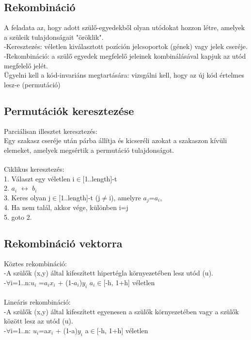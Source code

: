 \documentclass{article}
\begin{document}
	 \subsection{Rekombináció}
	 A feladata az, hogy adott szülő-egyedekből olyan utódokat hozzon létre, amelyek a szüleik tulajdonságait "öröklik".\\
	 -Keresztezés: véletlen kiválasztott pozíción jelcsoportok (gének) vagy jelek cseréje.\\
	 -Rekombináció: a szülő egyedek megfelelő jeleinek kombinálásával kapjuk az utód megfelelő jelét.\\
	 Ügyelni kell a kód-invariáns megtartására: vizsgálni kell, hogy az új kód értelmes lesz-e (permutáció)
	 
	 \subsection{Permutációk keresztezése}
	 Parciálisan illesztet keresztezés:\\
	 Egy szakasz cseréje után párba állítja és kicseréli azokat a szakaszon kívüli elemeket, amelyek megsértik a permutáció tulajdonságot.\\ \\
	 Ciklikus keresztezés:\\
	 1. Választ egy véletlen i$\in$[1..length]-t\\
	 2. $a_i$ $\leftrightarrow$ $b_i$ \\
	 3. Keres olyan j$\in$[1..length]-t (j$\neq$i), amelyre $a_j$=$a_i$,\\
	 4. Ha nem talál, akkor vége, különben i=j\\
	 5. goto 2.\\
	 
	 \subsection{Rekombináció vektorra}
	 Köztes rekombináció: \\
	 -A szülők (x,y) által kifeszített hipertégla környezetében lesz utód (u).\\
	 -$\forall$i=1..n:$u_i$ =$a_i$$x_i$ + (1-$a_i$)$y_i$  $a_i$$\in$[-h, 1+h] véletlen\\ \\
	 Lineáris rekombináció: \\
	 -A szülők (x,y) által kifeszített egyenesen a szülők környezetében vagy a szülők között lesz az utód (u).\\
	 -$\forall$i=1..n: $u_i$=a$x_i$ + (1-a)$y_i$ a$\in$[-h, 1+h] véletlen\\
	 
\end{document}
